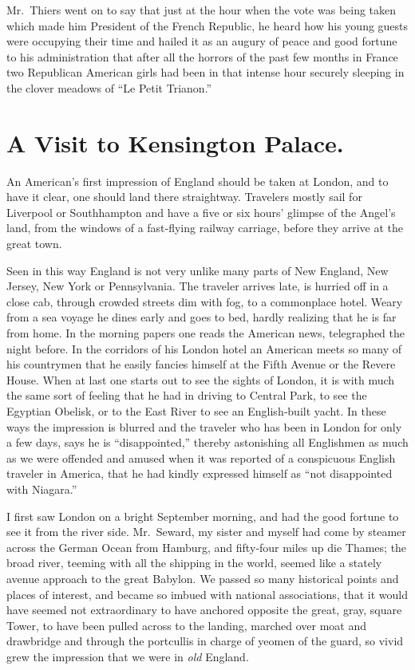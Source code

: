 \documentclass[12pt]{book}
\begin{document}
Mr.~Thiers went on to say that just at the hour when the vote was being taken
which made him President of the French Republic, he heard how his young guests
were occupying their time and hailed it as an augury of peace and good fortune
to his administration that after all the horrors of the past few months in France
two Republican American girls had been in that intense hour securely sleeping in
the clover meadows of “Le Petit Trianon.”

\chapter{A Visit to Kensington Palace.}

An American’s first impression of England should be taken at London, and to have
it clear, one should land there straightway. Travelers mostly sail for Liverpool or
Southhampton and have a five or six hours’ glimpse of the Angel’s land, from the
windows of a fast‐flying railway carriage, before they arrive at the great town.

Seen in this way England is not very unlike many parts of New England, New
Jersey, New York or Pennsylvania. The traveler arrives late, is hurried off in a
close cab, through crowded streets dim with fog, to a commonplace hotel. Weary
from a sea voyage he dines early and goes to bed, hardly realizing that he is far
from home. In the morning papers one reads the American news, telegraphed the
night before. In the corridors of his London hotel an American meets so many of
his countrymen that he easily fancies himself at the Fifth Avenue or the Revere
House. When at last one starts out to see the sights of London, it is with much
the same sort of feeling that he had in driving to Central Park, to see the Egyptian
Obelisk, or to the East River to see an English‐built yacht. In these ways the
impression is blurred and the traveler who has been in London for only a few
days, says he is “disappointed,” thereby astonishing all Englishmen as much as
we were offended and amused when it was reported of a conspicuous English
traveler in America, that he had kindly expressed himself as “not disappointed
with Niagara.”

I first saw London on a bright September morning, and had the good fortune
to see it from the river side. Mr.~Seward, my sister and myself had come by
steamer across the German Ocean from Hamburg, and fifty‐four miles up die
Thames; the broad river, teeming with all the shipping in the world, seemed like
a stately avenue approach to the great Babylon. We passed so many historical
points and places of interest, and became so imbued with national associations,
that it would have seemed not extraordinary to have anchored opposite the great,
gray, square Tower, to have been pulled across to the landing, marched over moat
and drawbridge and through the portcullis in charge of yeomen of the guard, so
vivid grew the impression that we were in {\it old} England.
\end{document}
